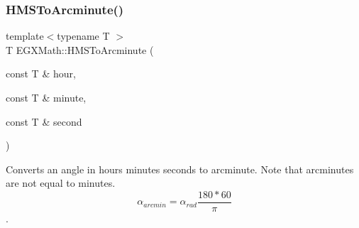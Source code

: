 \subsubsection{\texorpdfstring{H\+M\+S\+To\+Arcminute()}{HMSToArcminute()}}
{\footnotesize\ttfamily template$<$typename T $>$ \\
T E\+G\+X\+Math\+::\+H\+M\+S\+To\+Arcminute (\begin{DoxyParamCaption}\item[{const T \&}]{hour,  }\item[{const T \&}]{minute,  }\item[{const T \&}]{second }\end{DoxyParamCaption})}



Converts an angle in hours minutes seconds to arcminute. Note that arcminutes are not equal to minutes. \[\alpha_{arcmin}=\alpha_{rad}\frac{180 * 60}{\pi}\]. 

